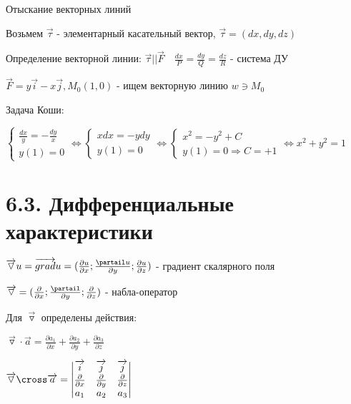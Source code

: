 \documentclass[12pt]{article}
\begin{document}
    \Nota Отыскание векторных линий

    Возьмем $\overrightarrow{\tau}$ - элементарный касательный вектор, $\overrightarrow{\tau} = (dx, dy, dz)$

    Определение векторной линии: $\overrightarrow{\tau} || \overrightarrow{F} \quad \frac{dx}{P} = \frac{dy}{Q} = \frac{dz}{R}$ - система ДУ

    \Ex $\overrightarrow{F} = y \overrightarrow{i} - x \overrightarrow{j}, M_0 (1, 0)$ - ищем векторную линию $w \ni M_0$

    Задача Коши:

    $\begin{cases}
         \frac{dx}{y} = -\frac{dy}{x} \\
         y(1) = 0
    \end{cases} \Longleftrightarrow \begin{cases}
                                        xdx = -ydy \\
                                        y(1) = 0
    \end{cases} \Longleftrightarrow \begin{cases}
                                        x^2 = -y^2 + C \\
                                        y(1) = 0 \Longrightarrow C = +1
    \end{cases} \Longleftrightarrow x^2 + y^2 = 1 $


    \section{6.3. Дифференциальные характеристики}

    \Mem $\overrightarrow{\triangledown}u = \overrightarrow{grad}u = (\frac{\partial u}{\partial x}; \frac{\partail u}{\partial y}; \frac{\partial u}{\partial z})$ - градиент скалярного поля

    $\overrightarrow{\triangledown} = (\frac{\partial}{\partial x}; \frac{\partail}{\partial y}; \frac{\partial}{\partial z})$ - набла-оператор

    \Nota Для $\overrightarrow{\triangledown}$ определены действия:

    $\overrightarrow{\triangledown} \cdot \overrightarrow{a} = \frac{\partial a_1}{\partial x} + \frac{\partial a_2}{\partial y} + \frac{\partial a_3}{\partial z}$

    $\overrightarrow{\triangledown} \cross \overrightarrow{a} =
    \begin{vmatrix}
        \overrightarrow{i}          & \overrightarrow{j}          & \overrightarrow{j}          \\
        \frac{\partial}{\partial x} & \frac{\partial}{\partial y} & \frac{\partial}{\partial z} \\
        a_1                         & a_2                         & a_3
    \end{vmatrix}$
\end{document}
